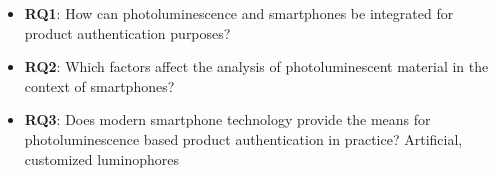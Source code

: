 \documentclass[thesis.tex]{subfiles}
\begin{document}
\begin{itemize}
  \item \textbf{RQ1}: How can photoluminescence and smartphones be integrated for product authentication purposes?
  \item \textbf{RQ2}: Which factors affect the analysis of photoluminescent material in the context of smartphones?
  \item \textbf{RQ3}: Does modern smartphone technology provide the means for photoluminescence based product authentication in practice?
    Artificial, customized luminophores
\end{itemize}
\end{document}
